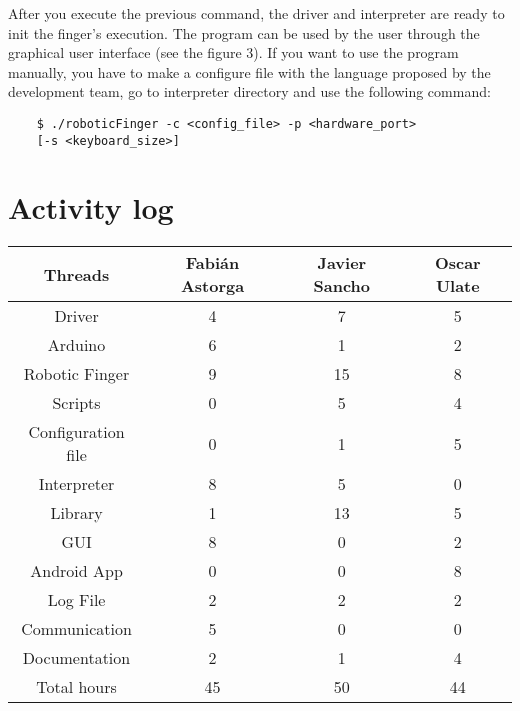\documentclass[12pt]{article}
\begin{document}
After you execute the previous command, the driver and interpreter are ready to init the finger's execution. The program can be used by the user through the graphical user interface (see the figure 3).
If you want to use the program manually, you have to make a configure file with the language proposed by the development team, go to interpreter directory and use the following command:

\begin{center}
\begin{lstlisting}
	$ ./roboticFinger -c <config_file> -p <hardware_port>
    [-s <keyboard_size>]
\end{lstlisting}
\end{center}





\section{Activity log}
\begin{center}
\begin{tabular}{ |c|c|c|c| }
 \hline
Threads & Fabián Astorga & Javier Sancho & Oscar Ulate \\ [0,1cm]
 \hline
Driver & 4 & 7 & 5\\ [0,1cm]
Arduino & 6 & 1 & 2\\ [0,1cm]
Robotic Finger & 9 & 15 & 8\\ [0,1cm]
Scripts & 0 & 5 & 4\\ [0,1cm]
Configuration file & 0 & 1 & 5\\ [0,1cm]
Interpreter & 8 & 5 & 0\\ [0,1cm]
Library& 1 & 13 & 5\\ [0,1cm]
GUI & 8 & 0 &2\\ [0,1cm]
Android App & 0 & 0 &8\\ [0,1cm]
Log File & 2 & 2 & 2\\ [0,1cm]
Communication & 5 & 0 & 0\\ [0,1cm]
Documentation & 2 & 1 & 4\\ [0,1cm]
 \hline
Total hours & 45 & 50 & 44\\ [0,1cm]
 \hline
\end{tabular}
\end{center}
\end{document}
